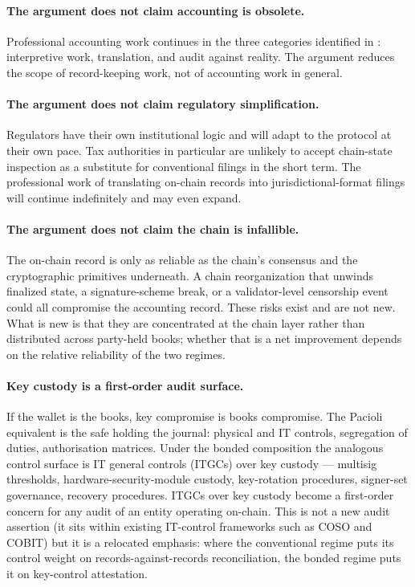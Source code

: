 \documentclass[11pt,a4paper]{article}
\theoremstyle{definition}
\theoremstyle{remark}
\begin{document}
\paragraph{The argument does not claim accounting is obsolete.}
Professional accounting work continues in the three
categories identified in : interpretive
work, translation, and audit against reality. The argument
reduces the scope of record-keeping work, not of accounting
work in general.

\paragraph{The argument does not claim regulatory simplification.}
Regulators have their own institutional logic and will adapt
to the protocol at their own pace. Tax authorities in
particular are unlikely to accept chain-state inspection as
a substitute for conventional filings in the short term. The
professional work of translating on-chain records into
jurisdictional-format filings will continue indefinitely and
may even expand.

\paragraph{The argument does not claim the chain is
infallible.}
The on-chain record is only as reliable as the chain's
consensus and the cryptographic primitives underneath. A
chain reorganization that unwinds finalized state, a
signature-scheme break, or a validator-level censorship
event could all compromise the accounting record. These
risks exist and are not new. What is new is that they are
concentrated at the chain layer rather than distributed
across party-held books; whether that is a net improvement
depends on the relative reliability of the two regimes.

\paragraph{Key custody is a first-order audit surface.}
If the wallet is the books, key compromise is books
compromise. The Pacioli equivalent is the safe holding the
journal: physical and IT controls, segregation of duties,
authorisation matrices. Under the bonded composition the
analogous control surface is IT general controls (ITGCs) over
key custody --- multisig thresholds, hardware-security-module
custody, key-rotation procedures, signer-set governance,
recovery procedures. ITGCs over key custody become a
first-order concern for any audit of an entity operating
on-chain. This is not a new audit assertion (it sits within
existing IT-control frameworks such as COSO and COBIT) but it
is a relocated emphasis: where the conventional regime puts
its control weight on records-against-records reconciliation,
the bonded regime puts it on key-control attestation.
\end{document}
